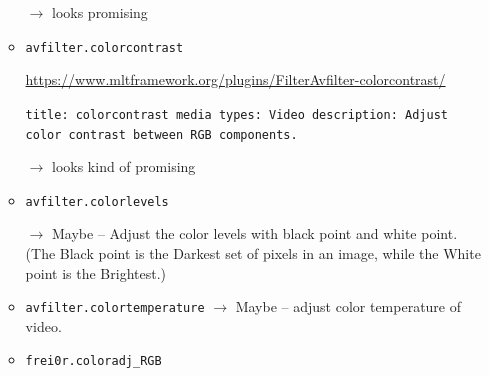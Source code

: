 \documentclass[12pt,a4paper]{article}
\begin{document}
\begin{itemize}
\begin{itemize}
		$\rightarrow$ looks promising
		
		
		

		

		
		\item \texttt{avfilter.colorcontrast}
		
		\url{https://www.mltframework.org/plugins/FilterAvfilter-colorcontrast/}
		
		\texttt{title: colorcontrast \newline
			media types: Video \newline
			description: Adjust color contrast between RGB components.}
		
		$\rightarrow$ looks kind of promising
		
		
		
		
		
		
		\item \texttt{avfilter.colorlevels}
		
		$\rightarrow$ Maybe -- Adjust the color levels with black point and white point.
		(The Black point is the Darkest set of pixels in an image, while the White point is the Brightest.)
		
		
		
		
		\item \texttt{avfilter.colortemperature}
		$\rightarrow$ Maybe -- adjust color temperature of video.
		
		
		\item \texttt{frei0r.coloradj\_RGB}
		

\end{itemize}
\end{itemize}
\end{document}
